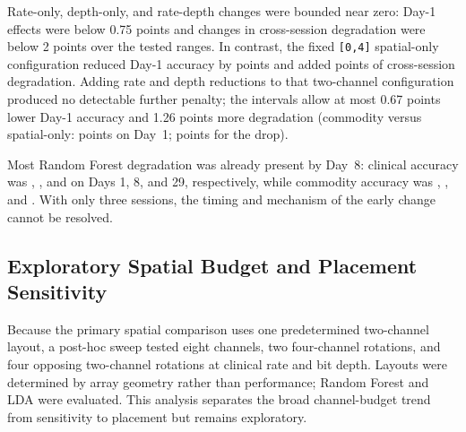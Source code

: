 \documentclass[preprint,12pt]{elsarticle}
\begin{document}
Rate-only, depth-only, and rate-depth changes were bounded near zero: Day-1 effects were below 0.75 points and changes in cross-session degradation were below 2 points over the tested ranges. In contrast, the fixed \texttt{[0,4]} spatial-only configuration reduced Day-1 accuracy by \spatialDayOnePenalty{} points and added \spatialDropPenalty{} points of cross-session degradation. Adding rate and depth reductions to that two-channel configuration produced no detectable further penalty; the intervals allow at most 0.67 points lower Day-1 accuracy and 1.26 points more degradation (commodity versus spatial-only: \commVsSpatialDayOne{} points \commVsSpatialDayOneCI{} on Day~1; \commVsSpatialDrop{} points \commVsSpatialDropCI{} for the drop).

Most Random Forest degradation was already present by Day~8: clinical accuracy was \rfClinDayOne{}, \rfClinDayEight{}, and \rfClinDayTwentyNine{} on Days 1, 8, and 29, respectively, while commodity accuracy was \rfCommDayOne{}, \rfCommDayEight{}, and \rfCommDayTwentyNine{}. With only three sessions, the timing and mechanism of the early change cannot be resolved.

\subsection{Exploratory Spatial Budget and Placement Sensitivity}\label{sec:spatial_sweep}
Because the primary spatial comparison uses one predetermined two-channel layout, a post-hoc sweep tested eight channels, two four-channel rotations, and four opposing two-channel rotations at clinical rate and bit depth. Layouts were determined by array geometry rather than performance; Random Forest and LDA were evaluated. This analysis separates the broad channel-budget trend from sensitivity to placement but remains exploratory.
\end{document}
